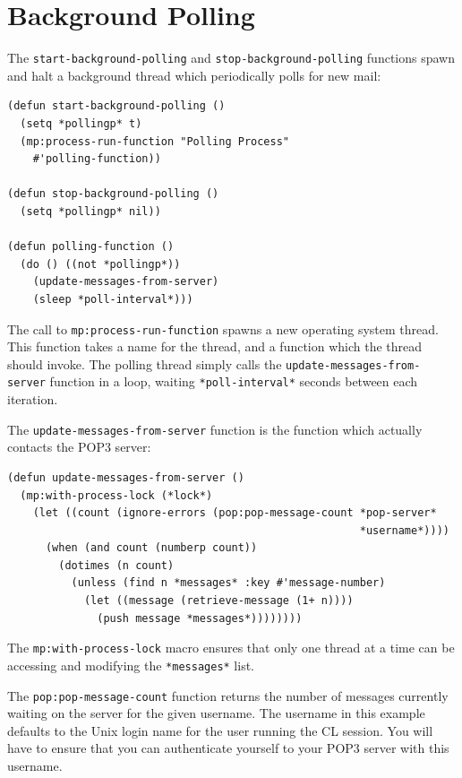 \section{Background Polling}

The \texttt{start-background-polling} and \texttt{stop-background-polling} functions spawn and
halt a background thread which periodically polls for new mail:

\begin{verbatim}
(defun start-background-polling ()
  (setq *pollingp* t)
  (mp:process-run-function "Polling Process"
    #'polling-function))

(defun stop-background-polling ()
  (setq *pollingp* nil))

(defun polling-function ()
  (do () ((not *pollingp*))
    (update-messages-from-server)
    (sleep *poll-interval*)))
\end{verbatim}

The call to \texttt{mp:process-run-function} spawns a new operating system thread. This function takes a name for the thread, and a function which the thread should invoke. The
polling thread simply calls the \texttt{update-messages-from-server} function in a loop, waiting \texttt{*poll-interval*} seconds between each iteration.

The \texttt{update-messages-from-server} function is the function which actually contacts
the POP3 server:

\begin{verbatim}
(defun update-messages-from-server ()
  (mp:with-process-lock (*lock*)
    (let ((count (ignore-errors (pop:pop-message-count *pop-server*
                                                       *username*))))
      (when (and count (numberp count))
        (dotimes (n count)
          (unless (find n *messages* :key #'message-number)
            (let ((message (retrieve-message (1+ n))))
              (push message *messages*))))))))
\end{verbatim}

The \texttt{mp:with-process-lock} macro ensures that only one thread at a time can be accessing
and modifying the \texttt{*messages*} list.

The \texttt{pop:pop-message-count} function returns the number of messages currently waiting on the server for the given username. The username in this example defaults to the
Unix login name for the user running the CL session. You will have to ensure that you can
authenticate yourself to your POP3 server with this username.


